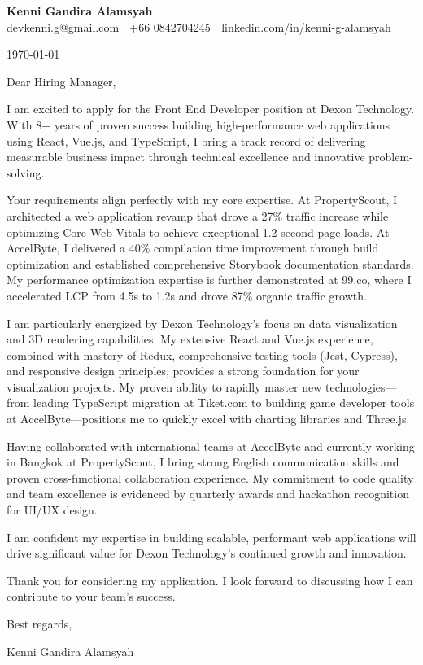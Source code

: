 \documentclass[11pt]{article}
\begin{document}
\begin{center}
  \textbf{\Large Kenni Gandira Alamsyah}\\
  \vspace{0.5em}
  \href{mailto:devkenni.g@gmail.com}{devkenni.g@gmail.com} $|$ +66 0842704245 $|$ \href{https://www.linkedin.com/in/kenni-g-alamsyah/}{linkedin.com/in/kenni-g-alamsyah}
\end{center}

\vspace{1em}

\today

\vspace{1em}

Dear Hiring Manager,

I am excited to apply for the Front End Developer position at Dexon Technology. With 8+ years of proven success building high-performance web applications using React, Vue.js, and TypeScript, I bring a track record of delivering measurable business impact through technical excellence and innovative problem-solving.

Your requirements align perfectly with my core expertise. At PropertyScout, I architected a web application revamp that drove a 27\% traffic increase while optimizing Core Web Vitals to achieve exceptional 1.2-second page loads. At AccelByte, I delivered a 40\% compilation time improvement through build optimization and established comprehensive Storybook documentation standards. My performance optimization expertise is further demonstrated at 99.co, where I accelerated LCP from 4.5s to 1.2s and drove 87\% organic traffic growth.

I am particularly energized by Dexon Technology's focus on data visualization and 3D rendering capabilities. My extensive React and Vue.js experience, combined with mastery of Redux, comprehensive testing tools (Jest, Cypress), and responsive design principles, provides a strong foundation for your visualization projects. My proven ability to rapidly master new technologies---from leading TypeScript migration at Tiket.com to building game developer tools at AccelByte---positions me to quickly excel with charting libraries and Three.js.

Having collaborated with international teams at AccelByte and currently working in Bangkok at PropertyScout, I bring strong English communication skills and proven cross-functional collaboration experience. My commitment to code quality and team excellence is evidenced by quarterly awards and hackathon recognition for UI/UX design.

I am confident my expertise in building scalable, performant web applications will drive significant value for Dexon Technology's continued growth and innovation.

Thank you for considering my application. I look forward to discussing how I can contribute to your team's success.

\vspace{1em}

Best regards,

\vspace{1em}

Kenni Gandira Alamsyah
\end{document}
